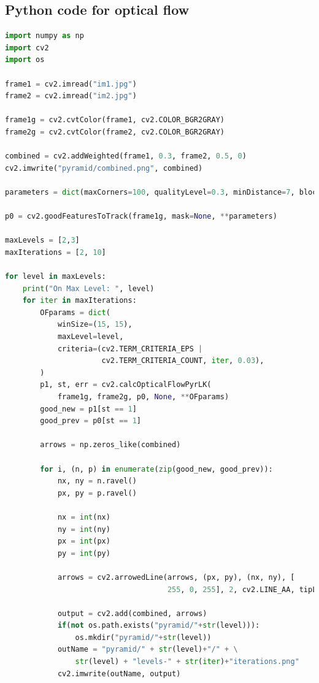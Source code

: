 \documentclass{article}
\begin{document}
    \newpage
    \begin{appendices}

        \section{Python code for optical flow}
        \label{appendix:OF}
        \begin{lstlisting}[language=Python]
import numpy as np
import cv2
import os

frame1 = cv2.imread("im1.jpg")
frame2 = cv2.imread("im2.jpg")

frame1g = cv2.cvtColor(frame1, cv2.COLOR_BGR2GRAY)
frame2g = cv2.cvtColor(frame2, cv2.COLOR_BGR2GRAY)

combined = cv2.addWeighted(frame1, 0.3, frame2, 0.5, 0)
cv2.imwrite("pyramid/combined.png", combined)

parameters = dict(maxCorners=100, qualityLevel=0.3, minDistance=7, blockSize=7)

p0 = cv2.goodFeaturesToTrack(frame1g, mask=None, **parameters)

maxLevels = [2,3]
maxIterations = [2, 10]

for level in maxLevels:
    print("On Max Level: ", level)
    for iter in maxIterations:
        OFparams = dict(
            winSize=(15, 15),
            maxLevel=level,
            criteria=(cv2.TERM_CRITERIA_EPS |
                      cv2.TERM_CRITERIA_COUNT, iter, 0.03),
        )
        p1, st, err = cv2.calcOpticalFlowPyrLK(
            frame1g, frame2g, p0, None, **OFparams)
        good_new = p1[st == 1]
        good_prev = p0[st == 1]

        arrows = np.zeros_like(combined)

        for i, (n, p) in enumerate(zip(good_new, good_prev)):
            nx, ny = n.ravel()
            px, py = p.ravel()

            nx = int(nx)
            ny = int(ny)
            px = int(px)
            py = int(py)

            arrows = cv2.arrowedLine(arrows, (px, py), (nx, ny), [
                                     255, 0, 255], 2, cv2.LINE_AA, tipLength=0.4)

            output = cv2.add(combined, arrows)
            if(not os.path.exists("pyramid/"+str(level))):
                os.mkdir("pyramid/"+str(level))
            outName = "pyramid/" + str(level)+"/" + \
                str(level) + "levels-" + str(iter)+"iterations.png"
            cv2.imwrite(outName, output)

        \end{lstlisting}

    \end{appendices}
\end{document}
